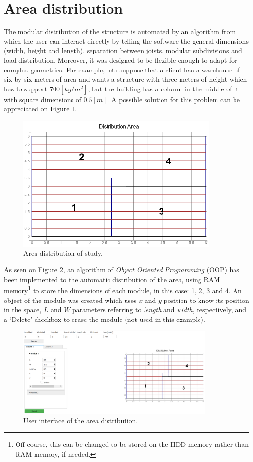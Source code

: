 \section{Area distribution}

The modular distribution of the structure is automated by an algorithm from which the user can interact directly by telling the software the general dimensions (width, height and length), separation between joists, modular subdivisions and load distribution. Moreover, it was designed to be flexible enough to adapt for complex geometries. For example, lets suppose that a client has a warehouse of six by six meters of area and wants a structure with three meters of height which has to support $700 \left[kg/ m^2 \right]$, but the building has a column in the middle of it with square dimensions of $0.5 [m]$. A possible solution for this problem can be appreciated on Figure \ref{area}.

\vspace{-0.7cm}

\begin{figure}[h!]
\centering
\includegraphics[width=0.9\textwidth]{Images/General/area2.PNG}
\caption{Area distribution of study.}
\label{area}
\end{figure}

\vspace{-0.7cm}

As seen on Figure \ref{area2}, an algorithm of \textit{Object Oriented Programming} (OOP) has been implemented to the automatic distribution of the area, using RAM memory\footnote{Off course, this can be changed to be stored on the HDD memory rather than RAM memory, if needed.} to store the dimensions of each module, in this case: 1, 2, 3 and 4. An object of the module was created which uses $x$ and $y$ position to know its position in the space, $L$ and $W$ parameters referring to \textit{length} and \textit{width}, respectively, and a `Delete' checkbox to erase the module (not used in this example).

\begin{figure}[h!]
\centering
\includegraphics[width=0.88\textwidth]{Images/General/area.PNG}
\caption{User interface of the area distribution.}
\label{area2}
\end{figure}